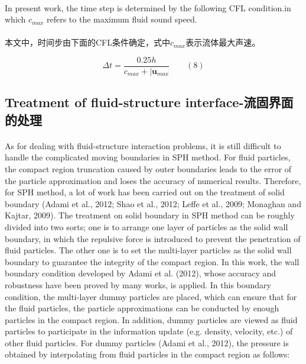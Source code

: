 \documentclass[UTF8]{ctexart}
\begin{document}
{{\paragraph{\quad}In present work, the time step is determined by the following
                CFL condition.in which $c_{max}$ refers to the maximum fluid sound speed. 
\paragraph{\quad}本文中，时间步由下面的CFL条件确定，式中$c_{max}$表示流体最大声速。

\begin{equation}
   \Delta t = \frac{0.25h}{c_{max}+|\mathbf{u}_{max}} \qquad (8)
\end{equation}


\subsection{Treatment of fluid-structure interface-流固界面的处理}
\paragraph{\quad}As for dealing with fluid-structure interaction problems, it is still 
                difficult to handle the complicated moving boundaries in SPH method. 
                For fluid particles, the compact region truncation caused by outer 
                boundaries leads to the error of the particle approximation and loses 
                the accuracy of numerical results. Therefore, for SPH method, a lot of 
                work has been carried out on the treatment of solid boundary 
                (Adami et al., 2012; Shao et al., 2012; Leffe et al., 2009; Monaghan and Kajtar, 2009). 
                The treatment on solid boundary in SPH method can be roughly divided into two sorts; 
                one is to arrange one layer of particles as the solid wall boundary, in which the 
                repulsive force is introduced to prevent the penetration of fluid particles. The other 
                one is to set the multi-layer particles as the solid wall boundary to guarantee the 
                integrity of the compact region. In this work, the wall boundary condition developed 
                by Adami et al. (2012), whose accuracy and robustness have been proved by many works, 
                is applied. In this boundary condition, the multi-layer dummy particles are placed, which 
                can ensure that for the fluid particles, the particle approximations can be conducted by 
                enough particles in the compact region. In addition, dummy particles are viewed as fluid 
                particles to participate in the information update (e.g. density, velocity, etc.) of other 
                fluid particles. For dummy particles (Adami et al., 2012), the pressure is obtained by 
                interpolating from fluid particles in the compact region as follows:
}}
\end{document}
